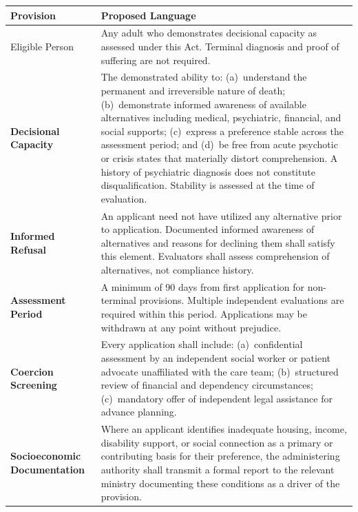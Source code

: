 \documentclass[11pt, letterpaper]{article}
\begin{document}
\begin{longtable}{>{\bfseries\sffamily\small}p{3cm} p{10.5cm}}
\toprule
\textbf{\sffamily Provision} & \textbf{\sffamily Proposed Language} \\
\midrule
\endhead
\bottomrule
\endfoot

Eligible Person
  & Any adult who demonstrates decisional capacity as assessed under this Act.
    Terminal diagnosis and proof of suffering are not required. \\[6pt]

Decisional Capacity
  & The demonstrated ability to: (a)~understand the permanent and irreversible nature
    of death; (b)~demonstrate informed awareness of available alternatives including
    medical, psychiatric, financial, and social supports; (c)~express a preference
    stable across the assessment period; and (d)~be free from acute psychotic or
    crisis states that materially distort comprehension.
    A history of psychiatric diagnosis does not constitute disqualification.
    Stability is assessed at the time of evaluation. \\[6pt]

Informed Refusal
  & An applicant need not have utilized any alternative prior to application.
    Documented informed awareness of alternatives and reasons for declining
    them shall satisfy this element. Evaluators shall assess comprehension
    of alternatives, not compliance history. \\[6pt]

Assessment Period
  & A minimum of 90 days from first application for non-terminal provisions.
    Multiple independent evaluations are required within this period.
    Applications may be withdrawn at any point without prejudice. \\[6pt]

Coercion Screening
  & Every application shall include: (a)~confidential assessment by an
    independent social worker or patient advocate unaffiliated with the
    care team; (b)~structured review of financial and dependency
    circumstances; (c)~mandatory offer of independent legal assistance
    for advance planning. \\[6pt]

Socioeconomic Documentation
  & Where an applicant identifies inadequate housing, income, disability
    support, or social connection as a primary or contributing basis for
    their preference, the administering authority shall transmit a formal
    report to the relevant ministry documenting these conditions as a
    driver of the provision. \\[6pt]


\end{longtable}
\end{document}
